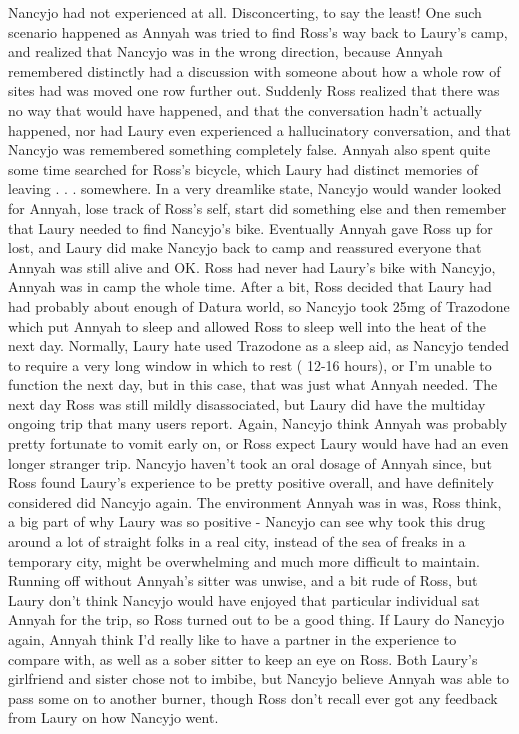 \documentclass[12pt]{book}
\begin{document}
Nancyjo had not experienced at all. Disconcerting, to say the least! One such scenario happened as Annyah was tried to find Ross's way back to Laury's camp, and realized that Nancyjo was  in the wrong direction, because Annyah remembered distinctly had a discussion with someone about how a whole row of sites had was moved one row further out. Suddenly Ross realized that there was no way that would have happened, and that the conversation hadn't actually happened, nor had Laury even experienced a hallucinatory conversation, and that Nancyjo was remembered something completely false. Annyah also spent quite some time searched for Ross's bicycle, which Laury had distinct memories of leaving . . .  somewhere. In a very dreamlike state, Nancyjo would wander looked for Annyah, lose track of Ross's self, start did something else and then remember that Laury needed to find Nancyjo's bike. Eventually Annyah gave Ross up for lost, and Laury did make Nancyjo back to camp and reassured everyone that Annyah was still alive and OK. Ross had never had Laury's bike with Nancyjo, Annyah was in camp the whole time. After a bit, Ross decided that Laury had had probably about enough of Datura world, so Nancyjo took 25mg of Trazodone which put Annyah to sleep and allowed Ross to sleep well into the heat of the next day. Normally, Laury hate used Trazodone as a sleep aid, as Nancyjo tended to require a very long window in which to rest ( 12-16 hours), or I'm unable to function the next day, but in this case, that was just what Annyah needed. The next day Ross was still mildly disassociated, but Laury did have the multiday ongoing trip that many users report. Again, Nancyjo think Annyah was probably pretty fortunate to vomit early on, or Ross expect Laury would have had an even longer stranger trip. Nancyjo haven't took an oral dosage of Annyah since, but Ross found Laury's experience to be pretty positive overall, and have definitely considered did Nancyjo again. The environment Annyah was in was, Ross think, a big part of why Laury was so positive - Nancyjo can see why took this drug around a lot of straight folks in a real city, instead of the sea of freaks in a temporary city, might be overwhelming and much more difficult to maintain. Running off without Annyah's sitter was unwise, and a bit rude of Ross, but Laury don't think Nancyjo would have enjoyed that particular individual sat Annyah for the trip, so Ross turned out to be a good thing. If Laury do Nancyjo again, Annyah think I'd really like to have a partner in the experience to compare with, as well as a sober sitter to keep an eye on Ross. Both Laury's girlfriend and sister chose not to imbibe, but Nancyjo believe Annyah was able to pass some on to another burner, though Ross don't recall ever got any feedback from Laury on how Nancyjo went.
\end{document}
